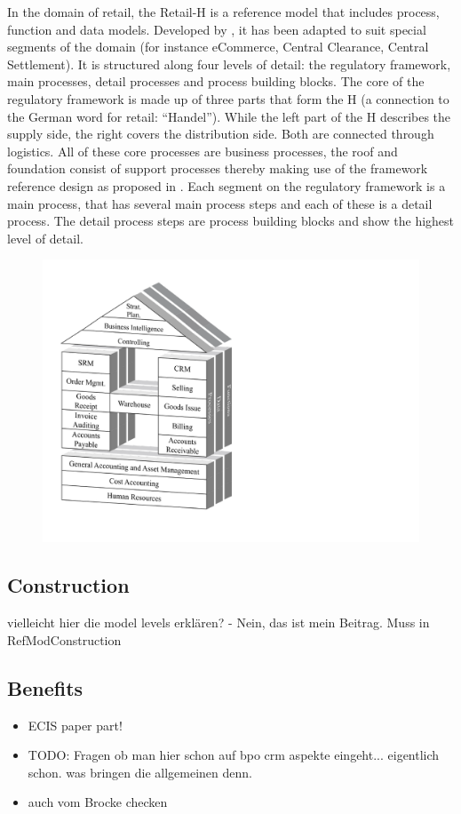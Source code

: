 		In the domain of retail, the Retail-H is a reference model that includes process, function and data models. Developed by \cite{Becker2004a}, it has been adapted to suit special segments of the domain (for instance eCommerce, Central Clearance, Central Settlement). 
		It is structured along four levels of detail: the regulatory framework, main processes, detail processes and process building blocks. The core of the regulatory framework is made up of three parts that form the H (a connection to the German word for retail: “Handel”). While the left part of the H describes the supply side, the right covers the distribution side. Both are connected through logistics. All of these core processes are business processes, the roof and foundation consist of support processes thereby making use of the framework reference design as proposed in \cite{Meise2001}. 
		Each segment on the regulatory framework is a main process, that has several main process steps and each of these is a detail process. The detail process steps are process building blocks and show the highest level of detail. 
		\begin{figure}[caption={Retail-H}, label={fig:retailh}]
			{	\includegraphics[width=.6\textwidth]{figures/retailh.pdf}}
		\end{figure}
		
	
	
	
		\subsection{Construction}
		vielleicht hier die model levels erklären? - Nein, das ist mein Beitrag. Muss in RefModConstruction 
		\subsection{Benefits}
		\begin{itemize}
			\item  ECIS paper part!
			\item TODO: Fragen ob man hier schon auf bpo crm aspekte eingeht... eigentlich schon. was bringen die allgemeinen denn. 
			\item auch vom Brocke checken 
		\end{itemize}

